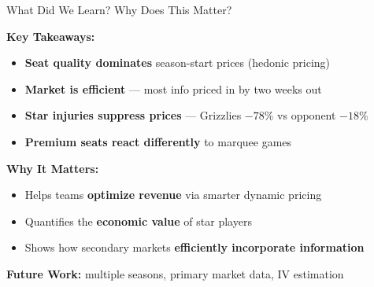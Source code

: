 \documentclass{beamer}
\begin{document}
\begin{frame}{What Did We Learn? Why Does This Matter?}

\textbf{Key Takeaways:}
\begin{itemize}
  \item \textbf{Seat quality dominates} season-start prices (hedonic pricing)
  \item \textbf{Market is efficient} — most info priced in by two weeks out
  \item \textbf{Star injuries suppress prices} — Grizzlies $-78\%$ vs opponent $-18\%$
  \item \textbf{Premium seats react differently} to marquee games
\end{itemize}

\vspace{0.5em}
\textbf{Why It Matters:}
\begin{itemize}
  \item Helps teams \textbf{optimize revenue} via smarter dynamic pricing
  \item Quantifies the \textbf{economic value} of star players
  \item Shows how secondary markets \textbf{efficiently incorporate information}
\end{itemize}

\vspace{0.5em}
\textbf{Future Work:} multiple seasons, primary market data, IV estimation

\end{frame}
\end{document}
